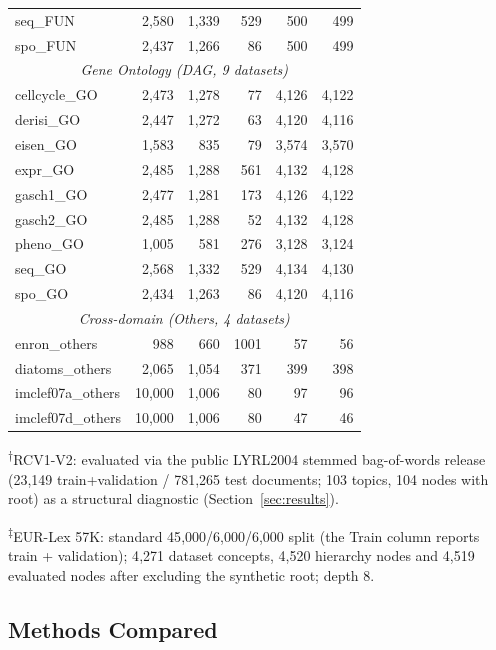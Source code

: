 \documentclass[preprint,12pt]{elsarticle}
\begin{document}
\begin{table}[htbp]
\begin{tabular}{lrrrrr}
seq\_FUN       & 2,580 & 1,339 & 529 & 500 & 499 \\
spo\_FUN       & 2,437 & 1,266 & 86  & 500 & 499 \\
\midrule
\multicolumn{6}{c}{\textit{Gene Ontology (DAG, 9 datasets)}} \\
cellcycle\_GO & 2,473 & 1,278 & 77  & 4,126 & 4,122 \\
derisi\_GO    & 2,447 & 1,272 & 63  & 4,120 & 4,116 \\
eisen\_GO     & 1,583 & 835   & 79  & 3,574 & 3,570 \\
expr\_GO      & 2,485 & 1,288 & 561 & 4,132 & 4,128 \\
gasch1\_GO    & 2,477 & 1,281 & 173 & 4,126 & 4,122 \\
gasch2\_GO    & 2,485 & 1,288 & 52  & 4,132 & 4,128 \\
pheno\_GO     & 1,005 & 581   & 276 & 3,128 & 3,124 \\
seq\_GO       & 2,568 & 1,332 & 529 & 4,134 & 4,130 \\
spo\_GO       & 2,434 & 1,263 & 86  & 4,120 & 4,116 \\
\midrule
\multicolumn{6}{c}{\textit{Cross-domain (Others, 4 datasets)}} \\
enron\_others      & 988    & 660   & 1001 & 57   & 56 \\
diatoms\_others    & 2,065  & 1,054 & 371  & 399  & 398 \\
imclef07a\_others  & 10,000 & 1,006 & 80   & 97   & 96 \\
imclef07d\_others  & 10,000 & 1,006 & 80   & 47   & 46 \\
\bottomrule
\end{tabular}
\vspace{4pt}
\par\noindent\textsuperscript{$\dagger$}RCV1-V2: evaluated via the public LYRL2004
stemmed bag-of-words release (23{,}149 train+validation / 781{,}265 test documents;
103 topics, 104 nodes with root) as a structural diagnostic (Section~\ref{sec:results}).
\par\noindent\textsuperscript{$\ddagger$}EUR-Lex 57K: standard
45{,}000/6{,}000/6{,}000 split (the Train column reports train +
validation); 4{,}271 dataset concepts, 4{,}520 hierarchy nodes and
4{,}519 evaluated nodes after excluding the synthetic root; depth 8.
\end{table}

\subsection{Methods Compared}
\end{document}
